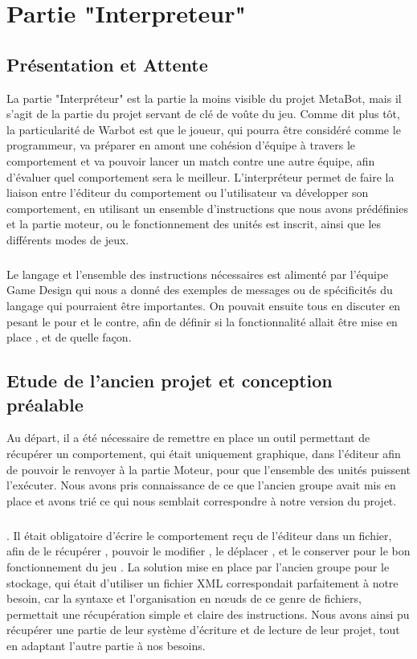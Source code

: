 \documentclass{report}
\begin{document}
\newpage
\chapter{Partie "Interpreteur"}
\section{Présentation et Attente}
La partie "Interpréteur" est la partie la moins visible du projet MetaBot,
mais il s'agit de la partie du projet servant de clé de voûte du jeu.
Comme dit plus tôt, la particularité de Warbot est que le joueur, qui pourra être considéré comme le programmeur, va préparer en amont une cohésion d'équipe à travers le comportement et va pouvoir lancer un match contre une autre équipe, afin d'évaluer quel comportement sera le meilleur.
L'interpréteur permet de faire la liaison entre l'éditeur du comportement ou l'utilisateur va développer son comportement, en utilisant un ensemble d'instructions que nous avons prédéfinies  et la partie moteur, ou le fonctionnement des unités est inscrit, ainsi que les différents modes de jeux.
\paragraph{}
Le langage et l'ensemble des instructions nécessaires est alimenté par l'équipe Game Design qui nous a donné des exemples de messages ou de spécificités du langage qui pourraient être importantes. On pouvait ensuite tous en discuter en pesant le pour et le contre, afin de définir si la fonctionnalité allait être mise en place , et de quelle façon.

\section{Etude de l'ancien projet et conception préalable}

Au départ, il a été nécessaire de remettre en place un outil permettant de récupérer un comportement, qui était uniquement graphique, dans l'éditeur afin de pouvoir le renvoyer à la partie Moteur, pour que l'ensemble des unités puissent l'exécuter.
Nous avons pris connaissance de ce que l'ancien groupe avait mis en place et avons trié ce qui nous semblait correspondre à notre version du projet.
\paragraph{}
.
Il était obligatoire d'écrire le comportement reçu de l'éditeur dans un fichier, afin de le récupérer , pouvoir le modifier , le déplacer , et le conserver pour le bon fonctionnement du jeu .
La solution mise en place par l'ancien groupe pour le stockage, qui était d'utiliser un fichier XML correspondait parfaitement à notre besoin, car la syntaxe et l'organisation en nœuds de ce genre de fichiers, permettait une récupération simple et claire des instructions. Nous avons ainsi pu récupérer une partie de leur système d'écriture et de lecture de leur projet, tout en adaptant l'autre partie à nos besoins.
\end{document}

